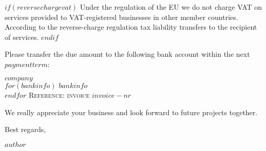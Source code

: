 \documentclass[12, a4paper]{article}
\begin{document}
\vspace{10mm}

$if(reversechargevat)$
Under the regulation of the EU we do not charge VAT on services provided to VAT-registered businesses in other member countries. According to the reverse-charge regulation tax liability transfers to the recipient of services.
$endif$

\begin{minipage}{\textwidth}
  Please transfer the due amount to the following bank account within the next $paymentterm$:

\vspace{5mm}

\textsc{\textbf{$company$}}\\
$for(bankinfo)$
\textsc{$bankinfo$}\\
$endfor$
\textsc{Reference: invoice $invoice-nr$}
\end{minipage}

\vspace{5mm}

\begin{minipage}{\textwidth}
  We really appreciate your business and look forward to future projects together.

  Best regards,

\vspace{5mm}

$author$
\end{minipage}

\end{document}
